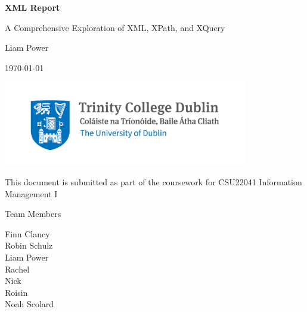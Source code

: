 \documentclass{article} %
\begin{document}
\begin{titlepage}
    \centering
    \vspace*{1cm}

    {\Huge \bfseries XML Report \par}
    \vspace{1.5cm}

    {\Large A Comprehensive Exploration of XML, XPath, and XQuery \par}
    \vspace{2cm}

    {\large Liam Power \par}
    \vspace{0.5cm}

    {\large \today \par}

    \vfill
    \includegraphics[width=0.8\textwidth]{Trinity_Main_Logo.jpg} %

    \vfill
    {\large This document is submitted as part of the coursework for CSU22041 Information Management I}

\end{titlepage}

\begin{newpage}
\thispagestyle{empty} %

\vspace*{\fill} %

\begin{center}
    {\LARGE Team Members}
    
    \vspace{1cm} %

    {\Large 
        Finn Clancy \\[0.5cm]
        Robin Schulz \\[0.5cm]
        Liam Power \\[0.5cm]
        Rachel  \\[0.5cm]
        Nick  \\[0.5cm]
        Roisin  \\[0.5cm]
        Noah Scolard \\[0.5cm]
    }
\end{center}

\vspace*{\fill} %
\end{newpage}
\end{document}
